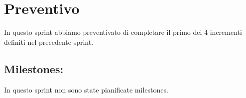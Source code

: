 \section{Preventivo}

In questo sprint abbiamo preventivato di completare il primo dei 4 incrementi definiti nel precedente sprint.

\subsection{Milestones:}  

In questo sprint non sono state pianificate milestones.